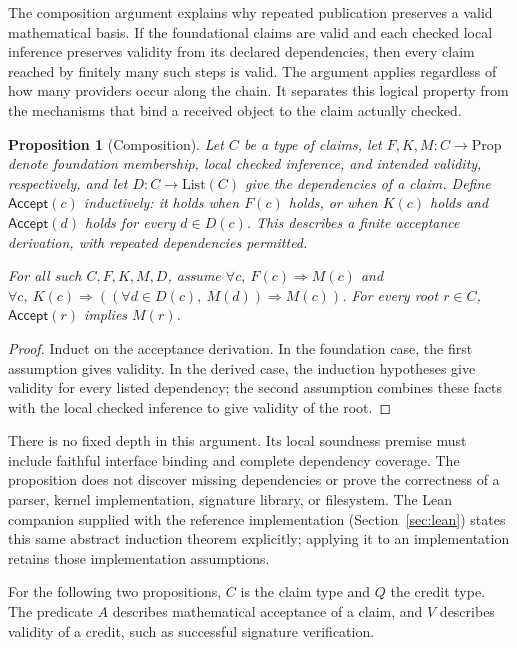 \documentclass[11pt]{article}
\newtheorem{proposition}{Proposition}
\newcommand{\Accept}{\mathsf{Accept}}
\begin{document}
The composition argument explains why repeated publication preserves a valid
mathematical basis. If the foundational claims are valid and each checked local
inference preserves validity from its declared dependencies, then every claim
reached by finitely many such steps is valid. The argument applies regardless
of how many providers occur along the chain. It separates this logical property
from the mechanisms that bind a received object to the claim actually checked.

\begin{proposition}[Composition]
Let
$C$ be a type of claims, let $F,K,M:C\to\mathrm{Prop}$ denote foundation
membership, local checked inference, and intended validity, respectively, and
let $D:C\to\mathrm{List}(C)$ give the dependencies of a claim. Define
$\Accept(c)$ inductively: it holds when $F(c)$ holds, or when $K(c)$ holds and
$\Accept(d)$ holds for every $d\in D(c)$. This describes a finite acceptance
derivation, with repeated dependencies permitted.

For all such $C,F,K,M,D$, assume
$\forall c,\ F(c)\Rightarrow M(c)$ and
$\forall c,\ K(c)\Rightarrow
((\forall d\in D(c),\ M(d))\Rightarrow M(c))$.
For every root $r\in C$, $\Accept(r)$ implies $M(r)$.
\end{proposition}

\begin{proof}
Induct on the acceptance derivation. In the foundation case, the first
assumption gives validity. In the derived case, the induction hypotheses give
validity for every listed dependency; the second assumption combines these
facts with the local checked inference to give validity of the root.
\end{proof}

There is no fixed depth in this argument. Its local soundness premise must
include faithful interface binding and complete dependency coverage. The
proposition does not discover missing dependencies or prove the correctness of
a parser, kernel implementation, signature library, or filesystem. The Lean
companion supplied with the reference implementation (Section~\ref{sec:lean})
states this same abstract induction theorem explicitly; applying it
to an implementation retains those implementation assumptions.

For the following two propositions, $C$ is the claim type and $Q$ the credit
type. The predicate $A$ describes mathematical acceptance of a claim, and
$V$ describes validity of a credit, such as successful signature verification.
\end{document}
